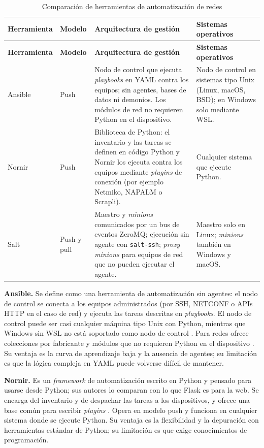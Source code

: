 \begin{longtable}{p{2.3cm}p{1.6cm}p{5.4cm}p{4.3cm}}
\caption{Comparación de herramientas de automatización de redes}\label{tab:herramientas}\\
\toprule
\textbf{Herramienta} & \textbf{Modelo} & \textbf{Arquitectura de gestión} & \textbf{Sistemas operativos} \\
\midrule
\endfirsthead
\toprule
\textbf{Herramienta} & \textbf{Modelo} & \textbf{Arquitectura de gestión} & \textbf{Sistemas operativos} \\
\midrule
\endhead
Ansible & Push & Nodo de control que ejecuta \textit{playbooks} en YAML contra los equipos; sin agentes, bases de datos ni demonios. Los módulos de red no requieren Python en el dispositivo. & Nodo de control en sistemas tipo Unix (Linux, macOS, BSD); en Windows solo mediante WSL. \\
Nornir & Push & Biblioteca de Python: el inventario y las tareas se definen en código Python y Nornir los ejecuta contra los equipos mediante \textit{plugins} de conexión (por ejemplo Netmiko, NAPALM o Scrapli). & Cualquier sistema que ejecute Python. \\
Salt & Push y pull & Maestro y \textit{minions} comunicados por un bus de eventos ZeroMQ; ejecución sin agente con \texttt{salt-ssh}; \textit{proxy minions} para equipos de red que no pueden ejecutar el agente. & Maestro solo en Linux; \textit{minions} también en Windows y macOS. \\
\bottomrule
\end{longtable}

\textbf{Ansible.} Se define como una herramienta de automatización sin agentes: el nodo de control se conecta a los equipos administrados (por SSH, NETCONF o APIs HTTP en el caso de red) y ejecuta las tareas descritas en \textit{playbooks}. El nodo de control puede ser casi cualquier máquina tipo Unix con Python, mientras que Windows sin WSL no está soportado como nodo de control \parencite{ansible_install}. Para redes ofrece colecciones por fabricante y módulos que no requieren Python en el dispositivo \parencite{ansible}. Su ventaja es la curva de aprendizaje baja y la ausencia de agentes; su limitación es que la lógica compleja en YAML puede volverse difícil de mantener.

\textbf{Nornir.} Es un \textit{framework} de automatización escrito en Python y pensado para usarse desde Python; sus autores lo comparan con lo que Flask es para la web. Se encarga del inventario y de despachar las tareas a los dispositivos, y ofrece una base común para escribir \textit{plugins} \parencite{nornir}. Opera en modelo push y funciona en cualquier sistema donde se ejecute Python. Su ventaja es la flexibilidad y la depuración con herramientas estándar de Python; su limitación es que exige conocimientos de programación.

